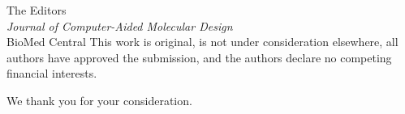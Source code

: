 \documentclass[11pt,a4paper]{letter}
\begin{document}
\begin{letter}{%
  The Editors \\
  \textit{Journal of Computer-Aided Molecular Design} \\
  BioMed Central
}
This work is original, is not under consideration elsewhere, all authors have approved the submission, and the authors declare no competing financial interests.

\closing{We thank you for your consideration.}



\end{letter}
\end{document}
